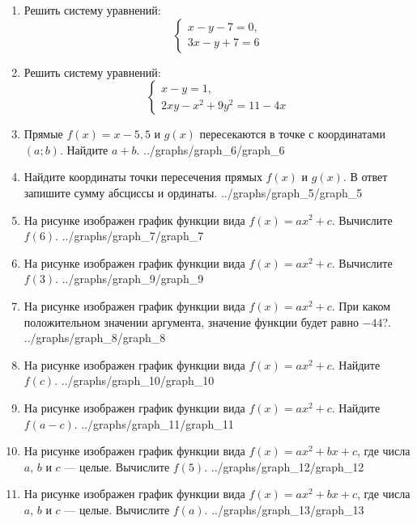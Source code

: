 \documentclass[12pt, a4paper]{article}
\begin{document}
	  
	\begin{enumerate}
		\item Решить систему уравнений:
		$$\left\{
		\begin{array}{l}
			x-y-7=0,\\
			3x-y+7=6
		\end{array}
		\right.$$
		\item Решить систему уравнений:
		$$\left\{
		\begin{array}{l}
			x-y=1,\\
			2xy-x^2+9y^2=11-4x
		\end{array}
		\right.$$
		\item \funcexer
		{Прямые $f(x)=x-5,5$ и $g(x)$ пересекаются в точке с координатами $(a;b)$. Найдите $a+b$.}
		{../graphs/graph_6/graph_6}
		\item \funcexer
		{Найдите координаты точки пересечения прямых $f(x)$ и $g(x)$. В ответ запишите сумму абсциссы и ординаты.}
		{../graphs/graph_5/graph_5}
		\item \funcexer
		{На рисунке изображен график функции вида $f(x)=ax^2+c$. Вычислите $f(6)$.}
		{../graphs/graph_7/graph_7}
		\item \funcexer
		{На рисунке изображен график функции вида $f(x)=ax^2+c$. Вычислите $f(3)$.}
		{../graphs/graph_9/graph_9}
		\item \funcexer
		{На рисунке изображен график функции вида $f(x)=ax^2+c$. При каком положительном значении аргумента, значение функции будет равно $-44$?.}
		{../graphs/graph_8/graph_8}
		\item \funcexer
		{На рисунке изображен график функции вида $f(x)=ax^2+c$. Найдите $f(c)$.}
		{../graphs/graph_10/graph_10}
		\item \funcexer
		{На рисунке изображен график функции вида $f(x)=ax^2+c$. Найдите $f(a-c)$.}
		{../graphs/graph_11/graph_11}
		\item \funcexer
		{На рисунке изображен график функции вида $f(x)=ax^2+bx+c$, где числа $a$, $b$ и $c$ — целые. Вычислите $f(5)$.}
		{../graphs/graph_12/graph_12}
		\item \funcexer
		{На рисунке изображен график функции вида $f(x)=ax^2+bx+c$, где числа $a$, $b$ и $c$ — целые. Вычислите $f(a)$.}
		{../graphs/graph_13/graph_13}
	\end{enumerate}
\end{document}

